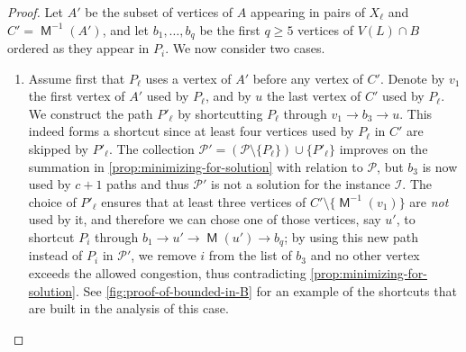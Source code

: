 \documentclass[a4paper,UKenglish,cleveref, autoref, thm-restate]{lipics-v2021}
\DeclareMathOperator{\Mat}{\mathsf M}
\begin{document}
\begin{proof}
  Let $A'$ be the subset of vertices of $A$ appearing in pairs of $X_\ell$ and $C' =
  \Mat^{-1}(A')$, and let $b_1, \ldots, b_q$ be the first $q \geq 5$ vertices of $V(L) \cap B$  ordered as they appear in $P_i$.
  We now consider two cases.

   \begin{enumerate}
      \item Assume first that $P_\ell$ uses a vertex of $A'$ before any vertex of $C'$.
      Denote by $v_1$ the first vertex of $A'$ used by $P_\ell$, and by $u$ the last vertex
      of $C'$ used by $P_\ell$.
      We construct the path $P'_\ell$ by shortcutting $P_\ell$ through $v_1 \to b_3 \to u$.
      This indeed forms a shortcut since at least four vertices used by $P_\ell$ in $C'$ are
      skipped by $P'_\ell$.
      The collection $\mathcal{P}' = (\mathcal{P} \setminus \{P_\ell\}) \cup \{P'_\ell\}$
      improves on the summation in \autoref{prop:minimizing-for-solution} with relation to
      $\mathcal{P}$, but $b_3$ is now used by $c+1$ paths and thus $\mathcal{P'}$ is not a
      solution for the instance $\mathcal{I}$.
      The choice of $P'_\ell$ ensures that at least three vertices of $C' \setminus
      \{\Mat^{-1}(v_1)\}$ are \textsl{not} used by it, and therefore we can chose one of those
      vertices, say $u'$, to shortcut $P_i$ through $b_1 \to u' \to \Mat(u') \to b_q$; by
      using this new path instead of $P_i$ in $\mathcal{P}'$, we remove $i$ from the list of $b_3$ and no other vertex exceeds the allowed congestion, thus contradicting
      \autoref{prop:minimizing-for-solution}.
      See \autoref{fig:proof-of-bounded-in-B} for an example of the shortcuts that are built in the analysis of this case.
    
      \begin{figure}[h]
        \centering
\end{figure}
\end{enumerate}
\end{proof}
\end{document}
